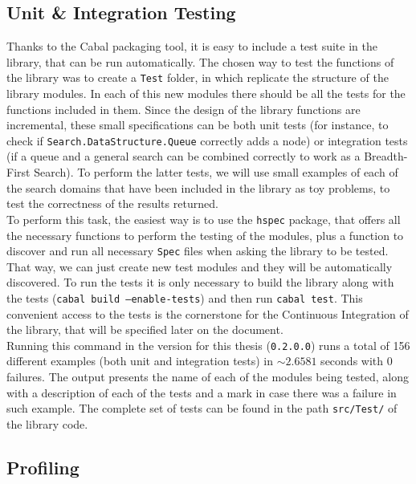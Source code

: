 \subsection{Unit \& Integration Testing}

Thanks to the Cabal packaging tool, it is easy to include a test suite in the
library, that can be run automatically. The chosen way to test the functions of
the library was to create a \texttt{Test} folder, in which replicate the
structure of the library modules. In each of this new modules there should be
all the tests for the functions included in them. Since the design of the
library functions are incremental, these small specifications can be both unit
tests (for instance, to check if \texttt{Search.DataStructure.Queue} correctly
adds a node) or integration tests (if a queue and a general search can be
combined correctly to work as a Breadth-First Search). To perform the latter
tests, we will use small examples of each of the search domains that have been
included in the library as toy problems, to test the correctness of the results
returned.\\

To perform this task, the easiest way is to use the \texttt{hspec} package,
that offers all the necessary functions to perform the testing of the modules,
plus a function to discover and run all necessary \texttt{Spec} files when
asking the library to be tested. That way, we can just create new test modules
and they will be automatically discovered. To run the tests it is only
necessary to build the library along with the tests (\texttt{cabal build
  --enable-tests}) and then run \texttt{cabal test}. This convenient access to
the tests is the cornerstone for the Continuous Integration of the library,
that will be specified later on the document.\\

Running this command in the version for this thesis (\texttt{0.2.0.0}) runs a
total of 156 different examples (both unit and integration tests) in
$\sim 2.6581$ seconds with 0 failures. The output presents the name of each of
the modules being tested, along with a description of each of the tests and a
mark in case there was a failure in such example. The complete set of tests can
be found in the path \texttt{src/Test/} of the library code.\\


\subsection{Profiling}

